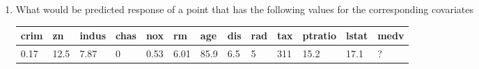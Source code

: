 \documentclass[12pt]{article}
\begin{document}
\begin{enumerate}
{{\begin{enumerate}
\item What would be predicted response of a point that has the following values for the corresponding covariates\\
{\small
 \begin{tabular}{|l|l|l|l|l|l|l|l|l|l|l|l|l|}
\hline
crim & zn   & indus & chas & nox  & rm   & age  & dis & rad & tax & ptratio & lstat & medv \\ \hline
0.17 & 12.5 & 7.87  & 0    & 0.53 & 6.01 & 85.9 & 6.5 & 5   & 311 & 15.2    & 17.1  &  ?    \\ \hline
\end{tabular}
}
\end{enumerate}
}}{

}\\





%
%
%
%
%
%
%
%
%
%
%
%
%
%
%
%
%
%
%
%
%
%
%
%
%


\end{enumerate}
\end{document}
